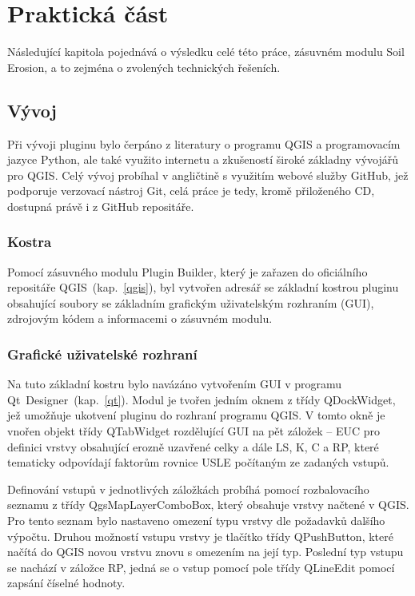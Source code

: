 \chapter{Praktická část}
\label{4-prakticka-cast}
Následující kapitola pojednává o výsledku celé této práce, zásuvném modulu Soil Erosion, a to zejména o zvolených technických řešeních.
\section{Vývoj}
Při vývoji pluginu bylo čerpáno z literatury o programu QGIS\cite{masteringQgis} a programovacím jazyce Python\cite{learningPython}\cite{diveIntoPython}, ale také využito internetu a zkušeností široké základny vývojářů pro QGIS\cite{stackexchange}. Celý vývoj probíhal v angličtině s využitím webové služby GitHub\cite{github}, jež podporuje verzovací nástroj Git, celá práce je tedy, kromě přiloženého CD, dostupná právě i z GitHub repositáře\cite{mujgithub}.
\subsection{Kostra}
Pomocí zásuvného modulu Plugin Builder, který je zařazen do oficiálního repositáře QGIS~(kap.~\ref{qgis}), byl vytvořen adresář se základní kostrou pluginu obsahující soubory se základním grafickým uživatelským rozhraním (GUI), zdrojovým kódem a informacemi o zásuvném modulu.
\subsection{Grafické uživatelské rozhraní}
Na tuto základní kostru bylo navázáno vytvořením GUI v programu Qt~Designer~(kap.~\ref{qt}). Modul je tvořen jedním oknem z třídy QDockWidget, jež umožňuje ukotvení pluginu do rozhraní programu QGIS. V tomto okně je vnořen objekt třídy QTabWidget rozdělující GUI na pět záložek – EUC pro definici vrstvy obsahující erozně uzavřené celky a dále LS, K, C a RP, které tematicky odpovídají faktorům rovnice USLE počítaným ze zadaných vstupů. 

Definování vstupů v jednotlivých záložkách probíhá pomocí rozbalovacího seznamu z třídy QgsMapLayerComboBox, který obsahuje vrstvy načtené v QGIS. Pro tento seznam bylo nastaveno omezení typu vrstvy dle požadavků dalšího výpočtu.  Druhou možností vstupu vrstvy je tlačítko třídy QPushButton, které načítá do QGIS novou vrstvu znovu s omezením na její typ. Poslední typ vstupu se nachází v záložce RP, jedná se o vstup pomocí pole třídy QLineEdit pomocí zapsání číselné hodnoty.

